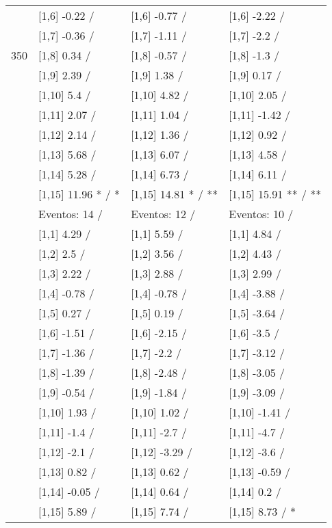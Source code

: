 \begin{table}
\begin{tabular}[t]{llll}
 & {}[1,6] -0.22  / & {}[1,6] -0.77  / & {}[1,6] -2.22  /\\
 & {}[1,7] -0.36  / & {}[1,7] -1.11  / & {}[1,7] -2.2  /\\
350 & {}[1,8] 0.34  / & {}[1,8] -0.57  / & {}[1,8] -1.3  /\\
\addlinespace
 & {}[1,9] 2.39  / & {}[1,9] 1.38  / & {}[1,9] 0.17  /\\
 & {}[1,10] 5.4  / & {}[1,10] 4.82  / & {}[1,10] 2.05  /\\
 & {}[1,11] 2.07  / & {}[1,11] 1.04  / & {}[1,11] -1.42  /\\
 & {}[1,12] 2.14  / & {}[1,12] 1.36  / & {}[1,12] 0.92  /\\
 & {}[1,13] 5.68  / & {}[1,13] 6.07  / & {}[1,13] 4.58  /\\
\addlinespace
 & {}[1,14] 5.28  / & {}[1,14] 6.73  / & {}[1,14] 6.11  /\\
 & {}[1,15] 11.96 * / * & {}[1,15] 14.81 * / ** & {}[1,15] 15.91 ** / **\\
 & Eventos:  14 / & Eventos:  12 / & Eventos:  10 /\\
 & {}[1,1] 4.29  / & {}[1,1] 5.59  / & {}[1,1] 4.84  /\\
 & {}[1,2] 2.5  / & {}[1,2] 3.56  / & {}[1,2] 4.43  /\\
\addlinespace
 & {}[1,3] 2.22  / & {}[1,3] 2.88  / & {}[1,3] 2.99  /\\
 & {}[1,4] -0.78  / & {}[1,4] -0.78  / & {}[1,4] -3.88  /\\
 & {}[1,5] 0.27  / & {}[1,5] 0.19  / & {}[1,5] -3.64  /\\
 & {}[1,6] -1.51  / & {}[1,6] -2.15  / & {}[1,6] -3.5  /\\
 & {}[1,7] -1.36  / & {}[1,7] -2.2  / & {}[1,7] -3.12  /\\
\addlinespace
500 & {}[1,8] -1.39  / & {}[1,8] -2.48  / & {}[1,8] -3.05  /\\
 & {}[1,9] -0.54  / & {}[1,9] -1.84  / & {}[1,9] -3.09  /\\
 & {}[1,10] 1.93  / & {}[1,10] 1.02  / & {}[1,10] -1.41  /\\
 & {}[1,11] -1.4  / & {}[1,11] -2.7  / & {}[1,11] -4.7  /\\
 & {}[1,12] -2.1  / & {}[1,12] -3.29  / & {}[1,12] -3.6  /\\
\addlinespace
 & {}[1,13] 0.82  / & {}[1,13] 0.62  / & {}[1,13] -0.59  /\\
 & {}[1,14] -0.05  / & {}[1,14] 0.64  / & {}[1,14] 0.2  /\\
 & {}[1,15] 5.89  / & {}[1,15] 7.74  / & {}[1,15] 8.73  / *\\
\bottomrule
\end{tabular}
\end{table}

